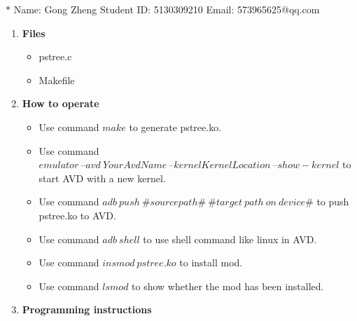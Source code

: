 \documentclass[12pt,a4paper]{article}
\newtheorem*{instruction}{Instruction}
\theoremstyle{definition}
\begin{document}
\noindent

\noindent{}
\begin{center}

\footnotesize{\color{blue}$*$ Name: Gong Zheng  \quad Student ID: 5130309210 \quad Email: 573965625@qq.com}
\end{center}
\begin{enumerate}
	\item \textbf{Files}
	\begin{itemize}
		\item pstree.c
		\item Makefile
	\end{itemize}

	\item \textbf{How to operate}
	\begin{itemize}
		\item Use command $make$ to generate pstree.ko.
		\item Use command $emulator\ –avd\ YourAvdName\ –kernel KernelLocation\ –show-kernel$ to start AVD with a new kernel.
		\item Use command $adb\ push\ \#source path\#\ \#target\ path\ on\ device\#$ to push pstree.ko to AVD.
		\item Use command $adb\ shell$ to use shell command like linux in AVD.
		\item Use command $insmod\ pstree.ko$ to install mod.
		\item Use command $lsmod$ to show whether the mod has been installed.
	\end{itemize}

	\item \textbf{Programming instructions}
\end{enumerate}
\end{document}
